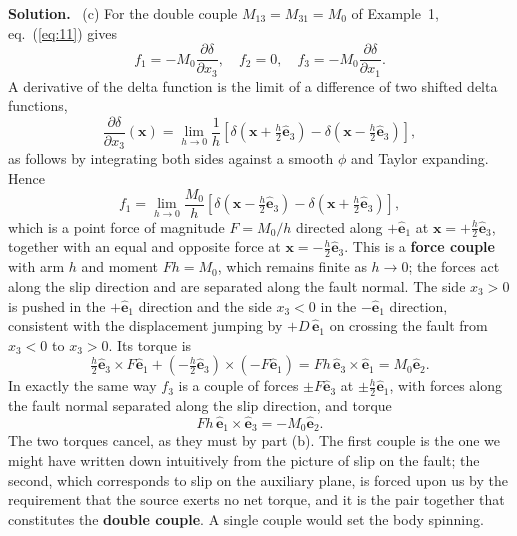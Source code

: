 \documentclass[a4paper,12pt]{paper}
\newenvironment{solution}{\par\noindent\textbf{Solution.}\ }{\par\medskip}
\begin{document}
\begin{solution}
(c) For the double couple $M_{13}=M_{31}=M_{0}$ of Example~1, eq.~(\ref{eq:11}) gives
\begin{equation}
f_{1}=-M_{0}\frac{\partial\delta}{\partial x_{3}},\quad f_{2}=0,\quad
f_{3}=-M_{0}\frac{\partial\delta}{\partial x_{1}}.
\label{eq:15}
\end{equation}
A derivative of the delta function is the limit of a difference of two shifted delta
functions,
\begin{equation}
\frac{\partial\delta}{\partial x_{3}}(\mathbf{x})
=\lim_{h\to0}\frac{1}{h}\left[\delta\!\left(\mathbf{x}+\tfrac{h}{2}\hat{\mathbf{e}}_{3}\right)
-\delta\!\left(\mathbf{x}-\tfrac{h}{2}\hat{\mathbf{e}}_{3}\right)\right],
\label{eq:16}
\end{equation}
as follows by integrating both sides against a smooth $\phi$ and Taylor expanding. Hence
\begin{equation}
f_{1}=\lim_{h\to0}\frac{M_{0}}{h}\left[\delta\!\left(\mathbf{x}-\tfrac{h}{2}\hat{\mathbf{e}}_{3}\right)
-\delta\!\left(\mathbf{x}+\tfrac{h}{2}\hat{\mathbf{e}}_{3}\right)\right],
\label{eq:17}
\end{equation}
which is a point force of magnitude $F=M_{0}/h$ directed along $+\hat{\mathbf{e}}_{1}$ at
$\mathbf{x}=+\tfrac{h}{2}\hat{\mathbf{e}}_{3}$, together with an equal and opposite force
at $\mathbf{x}=-\tfrac{h}{2}\hat{\mathbf{e}}_{3}$. This is a \textbf{force couple} with
arm $h$ and moment $Fh=M_{0}$, which remains finite as $h\to0$; the forces act along the
slip direction and are separated along the fault normal. The side $x_{3}>0$ is pushed in
the $+\hat{\mathbf{e}}_{1}$ direction and the side $x_{3}<0$ in the $-\hat{\mathbf{e}}_{1}$
direction, consistent with the displacement jumping by $+D\,\hat{\mathbf{e}}_{1}$ on
crossing the fault from $x_{3}<0$ to $x_{3}>0$. Its torque is
\begin{equation}
\tfrac{h}{2}\hat{\mathbf{e}}_{3}\times F\hat{\mathbf{e}}_{1}
+\left(-\tfrac{h}{2}\hat{\mathbf{e}}_{3}\right)\times\left(-F\hat{\mathbf{e}}_{1}\right)
=Fh\,\hat{\mathbf{e}}_{3}\times\hat{\mathbf{e}}_{1}=M_{0}\hat{\mathbf{e}}_{2}.
\label{eq:18}
\end{equation}
In exactly the same way $f_{3}$ is a couple of forces $\pm F\hat{\mathbf{e}}_{3}$ at
$\pm\tfrac{h}{2}\hat{\mathbf{e}}_{1}$, with forces along the fault normal separated along
the slip direction, and torque
\begin{equation}
Fh\,\hat{\mathbf{e}}_{1}\times\hat{\mathbf{e}}_{3}=-M_{0}\hat{\mathbf{e}}_{2}.
\label{eq:19}
\end{equation}
The two torques cancel, as they must by part (b). The first couple is the one we might
have written down intuitively from the picture of slip on the fault; the second, which
corresponds to slip on the auxiliary plane, is forced upon us by the requirement that the
source exerts no net torque, and it is the pair together that constitutes the
\textbf{double couple}. A single couple would set the body spinning.
\end{solution}
\end{document}

